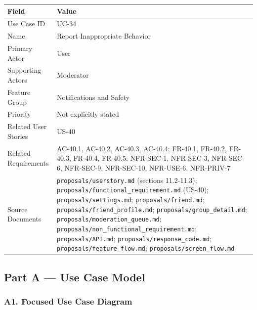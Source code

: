 \documentclass[12pt]{article}
\renewcommand{\baselinestretch}{1.5}
\begin{document}
\begingroup
\small
\renewcommand{\baselinestretch}{1.0}\selectfont
\renewcommand{\arraystretch}{1.15}
\setlength{\tabcolsep}{6pt}
\begin{longtable}{|>{\raggedright\arraybackslash}p{}|>{\raggedright\arraybackslash}p{}|}
\hline
\textbf{Field} & \textbf{Value} \\ \hline
\endhead
Use Case ID & UC-34 \\ \hline
Name & Report Inappropriate Behavior \\ \hline
Primary Actor & User \\ \hline
Supporting Actors & Moderator \\ \hline
Feature Group & Notifications and Safety \\ \hline
Priority & Not explicitly stated \\ \hline
Related User Stories & US-40 \\ \hline
Related Requirements & AC-40.1, AC-40.2, AC-40.3, AC-40.4; FR-40.1, FR-40.2, FR-40.3, FR-40.4, FR-40.5; NFR-SEC-1, NFR-SEC-3, NFR-SEC-6, NFR-SEC-9, NFR-SEC-10, NFR-USE-6, NFR-PRIV-7 \\ \hline
Source Documents & \texttt{proposals/userstory.md} (sections 11.2-11.3); \texttt{proposals/functional\_requirement.md} (US-40); \texttt{proposals/settings.md}; \texttt{proposals/friend.md}; \texttt{proposals/friend\_profile.md}; \texttt{proposals/group\_detail.md}; \texttt{proposals/moderation\_queue.md}; \texttt{proposals/non\_functional\_requirement.md}; \texttt{proposals/API.md}; \texttt{proposals/response\_code.md}; \texttt{proposals/feature\_flow.md}; \texttt{proposals/screen\_flow.md} \\ \hline
\end{longtable}
\endgroup
\par\medskip

\hypertarget{sec:part-a-use-case-model}{}
\subsection*{Part A --- Use Case Model}
\par\medskip

\hypertarget{sec:a1-focused-use-case-diagram}{}
\subsubsection*{A1. Focused Use Case Diagram}
\par\medskip
\end{document}
